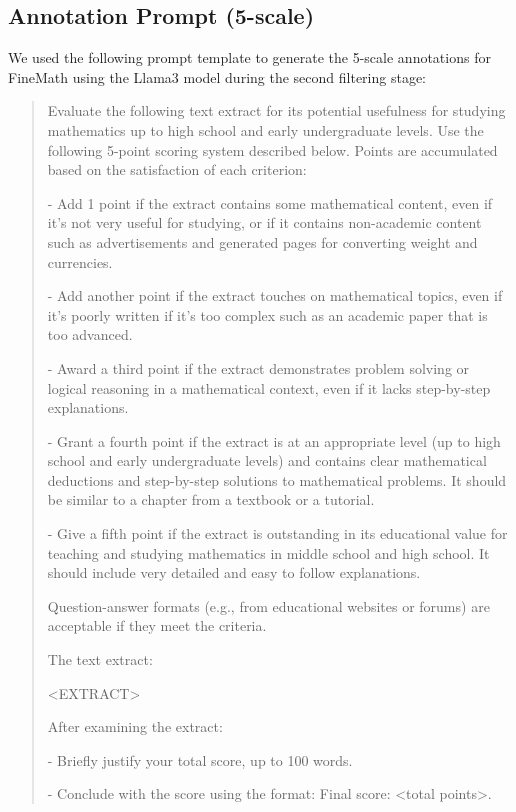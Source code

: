 \documentclass{article}
\theoremstyle{plain}
\theoremstyle{definition}
\theoremstyle{remark}
\begin{document}
\subsection{Annotation Prompt (5-scale)}\label{app:finemath-gold-prompt}

We used the following prompt template to generate the 5-scale annotations for FineMath using the Llama3 model during the second filtering stage:

\begin{quote}
\footnotesize
Evaluate the following text extract for its potential usefulness for studying mathematics up to high school and early undergraduate levels. Use the following 5-point scoring system described below. Points are accumulated based on the satisfaction of each criterion:

- Add 1 point if the extract contains some mathematical content, even if it's not very useful for studying, or if it contains non-academic content such as advertisements and generated pages for converting weight and currencies.

- Add another point if the extract touches on mathematical topics, even if it's poorly written if it's too complex such as an academic paper that is too advanced. 

- Award a third point if the extract demonstrates problem solving or logical reasoning in a mathematical context, even if it lacks step-by-step explanations.

- Grant a fourth point if the extract is at an appropriate level (up to high school and early undergraduate levels) and contains clear mathematical deductions and step-by-step solutions to mathematical problems. It should be similar to a chapter from a textbook or a tutorial.

- Give a fifth point if the extract is outstanding in its educational value for teaching and studying mathematics in middle school and high school. It should include very detailed and easy to follow explanations.

Question-answer formats (e.g., from educational websites or forums) are acceptable if they meet the criteria.

The text extract:

<EXTRACT>

After examining the extract:

- Briefly justify your total score, up to 100 words.

- Conclude with the score using the format: Final score: <total points>.
\end{quote}
\end{document}
